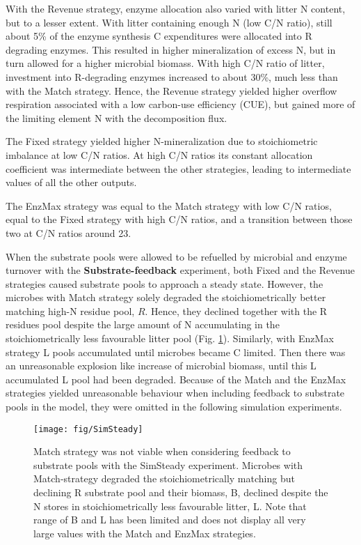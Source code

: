With the Revenue strategy, enzyme allocation also varied with litter N content,
but to a lesser extent.
With litter containing enough N (low C/N ratio), still about 5\% of the enzyme
synthesis C expenditures were allocated into R degrading enzymes. This resulted
in higher mineralization of excess N, but in turn allowed for a higher microbial
biomass.
With high C/N ratio of litter, investment into R-degrading enzymes increased to
about 30\%, much less than with the Match strategy. Hence, the Revenue strategy
yielded higher overflow respiration associated with a low carbon-use
efficiency (CUE), but gained more of the limiting element N with the
decomposition flux.

The Fixed strategy yielded higher N-mineralization due to stoichiometric
imbalance at low C/N ratios.
At high C/N ratios its constant allocation coefficient was intermediate between
the other strategies, leading to intermediate values of all the other outputs.

The EnzMax strategy was equal to the Match strategy with low C/N ratios,
equal to the Fixed strategy with high C/N ratios, and a transition between those
two at C/N ratios around 23.


When the substrate pools were allowed to be refuelled by microbial and enzyme
turnover with the \textbf{Substrate-feedback} experiment, both Fixed and the Revenue
strategies caused substrate pools to approach a steady state.
However, the microbes with Match strategy solely degraded the stoichiometrically
better matching high-N residue pool, $R$. Hence, they declined together with the
R residues pool despite the large amount of N accumulating in the
stoichiometrically less favourable litter pool (Fig. \ref{fig:SimSteady}).
Similarly, with EnzMax strategy L pools accumulated until microbes became C
limited. Then there was an unreasonable explosion like increase of microbial
biomass, until this L accumulated L pool had been degraded.
Because of the Match and the EnzMax strategies yielded unreasonable
behaviour when including feedback to substrate pools in the model,
they were omitted in the following simulation experiments.

\begin{figure}[t]
\vspace*{2mm}
\begin{center} 
\texttt{[image: fig/SimSteady]} 
\end{center}
\caption{
Match strategy was not viable when considering feedback to
substrate pools with the SimSteady experiment. Microbes with
Match-strategy degraded the stoichiometrically matching but declining R
substrate pool and their biomass, B, declined despite the N stores
in stoichiometrically less favourable litter, L. Note that range of B and L has
been limited and does not display all very large values with the Match and
EnzMax strategies.
\label{fig:SimSteady}} 
\end{figure}

